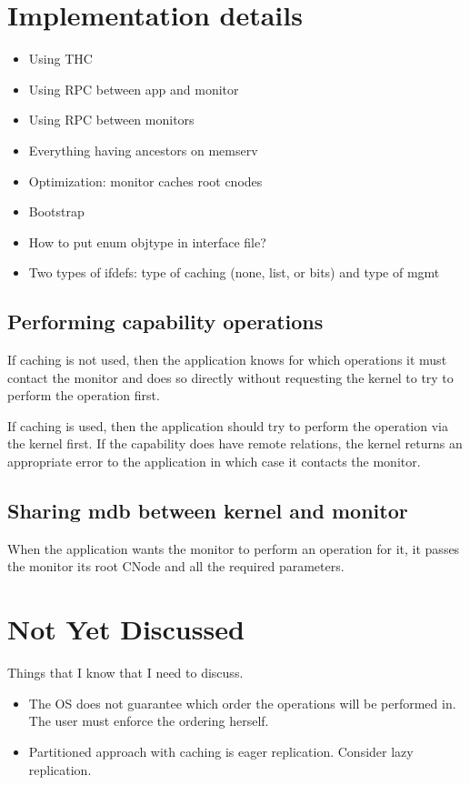 \documentclass[a4paper,twoside]{report} %
\begin{document}
\chapter{Implementation details}\label{chap:implementation}

\begin{itemize}
\item Using THC
\item Using RPC between app and monitor
\item Using RPC between monitors
\item Everything having ancestors on memserv
\item Optimization: monitor caches root cnodes
\item Bootstrap
\item How to put enum objtype in interface file?
\item Two types of ifdefs: type of caching (none, list, or bits) and
  type of mgmt
\end{itemize}

\section{Performing capability operations}
If caching is not used, then the application knows for which
operations it must contact the monitor and does so directly without
requesting the kernel to try to perform the operation first.

If caching is used, then the application should try to perform the
operation via the kernel first. If the capability does have remote
relations, the kernel returns an appropriate error to the application
in which case it contacts the monitor.

\section{Sharing mdb between kernel and monitor}
When the application wants the monitor to perform an operation for it,
it passes the monitor its root CNode and all the required parameters.


\chapter{Not Yet Discussed}\label{chap:nyd}

Things that I know that I need to discuss.

\begin{itemize}

\item The OS does not guarantee which order the operations will be
  performed in. The user must enforce the ordering herself.

\item Partitioned approach with caching is eager replication. Consider
  lazy replication.
\end{itemize}



\end{document}
